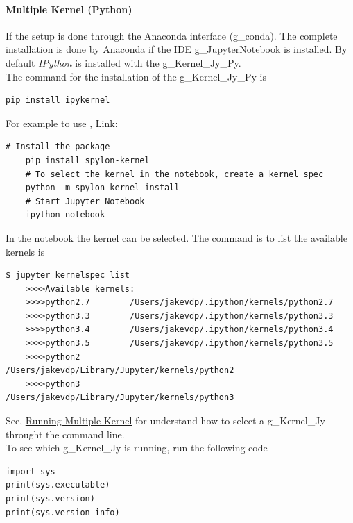 \paragraph{Multiple Kernel (Python)}
If the setup is done through the Anaconda interface (\gls{g_conda}). The complete installation is done by Anaconda if the \gls{IDE} \gls{g_JupyterNotebook} is installed. By default \textit{IPython} is installed with the \gls{g_Kernel_Jy_Py}.\\

The command for the installation of the \gls{g_Kernel_Jy_Py} is
\begin{lstlisting}[style=CMD, caption={pip to install ipykernel},captionpos=b]
	pip install ipykernel
\end{lstlisting}
For example to use , \href{https://community.databricks.com/t5/data-engineering/how-can-we-run-scala-in-a-jupyter-notebook/td-p/17752}{Link}:
\begin{lstlisting}[style=CMD, caption={Using Scala for a Notebook},captionpos=b]
	# Install the package
	pip install spylon-kernel
	# To select the kernel in the notebook, create a kernel spec
	python -m spylon_kernel install
	# Start Jupyter Notebook
	ipython notebook
\end{lstlisting}
In the notebook the kernel can be selected. The command is to list the available kernels is
\begin{lstlisting}[style=CMD, caption={pip to install ipykernel},captionpos=b]
	$ jupyter kernelspec list
	>>>>Available kernels:
	>>>>python2.7        /Users/jakevdp/.ipython/kernels/python2.7
	>>>>python3.3        /Users/jakevdp/.ipython/kernels/python3.3
	>>>>python3.4        /Users/jakevdp/.ipython/kernels/python3.4
	>>>>python3.5        /Users/jakevdp/.ipython/kernels/python3.5
	>>>>python2          /Users/jakevdp/Library/Jupyter/kernels/python2
	>>>>python3          /Users/jakevdp/Library/Jupyter/kernels/python3
\end{lstlisting}
See, \href{https://stackoverflow.com/questions/39007571/running-jupyter-with-multiple-python-and-ipython-paths}{Running Multiple Kernel} for understand how to select a \gls{g_Kernel_Jy} throught the command line. \\

To see which \gls{g_Kernel_Jy} is running, run the following code
\begin{lstlisting}[style=python]
import sys
print(sys.executable)
print(sys.version)
print(sys.version_info)
\end{lstlisting} 

